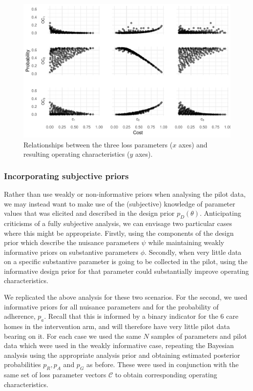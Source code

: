 \documentclass{article} %
\begin{document}
\begin{figure}
\centering
\includegraphics[scale=0.8]{./Figures/cost_OCs}
\caption{Relationships between the three loss parameters ($x$ axes) and resulting operating characteristics ($y$ axes).}
\label{fig:cost_OCs}
\end{figure}

\subsubsection{Incorporating subjective priors}

Rather than use weakly or non-informative priors when analysing the pilot data, we may instead want to make use of the (subjective) knowledge of parameter values that was elicited and described in the design prior $p_D(\theta)$. Anticipating criticisms of a fully subjective analysis, we can envisage two particular cases where this might be appropriate. Firstly, using the components of the design prior which describe the nuisance parameters $\psi$ while maintaining weakly informative priors on substantive parameters $\phi$. Secondly, when very little data on a specific substantive parameter is going to be collected in the pilot, using the informative design prior for that parameter could substantially improve operating characteristics.

We replicated the above analysis for these two scenarios. For the second, we used informative priors for all nuisance parameters and for the probability of adherence, $p_a$. Recall that this is informed by a binary indicator for the 6 care homes in the intervention arm, and will therefore have very little pilot data bearing on it. For each case we used the same $N$ samples of parameters and pilot data which were used in the weakly informative case, repeating the Bayesian analysis using the appropriate analysis prior and obtaining estimated posterior probabilities $p_R, p_A$ and $p_G$ as before. These were used in conjunction with the same set of loss parameter vectors $\mathcal{C}$ to obtain corresponding operating characteristics.
\end{document}
